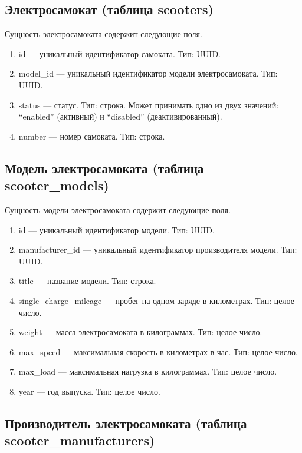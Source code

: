 \subsection{Электросамокат (таблица scooters)}

Сущность электросамоката содержит следующие поля.

\begin{enumerate}
	\item id --- уникальный идентификатор самоката. Тип: UUID.
	\item model\_id --- уникальный идентификатор модели электросамоката. Тип: UUID.
	\item status --- статус. Тип: строка. Может принимать одно из двух значений:
	      \enquote{enabled} (активный) и \enquote{disabled} (деактивированный).
	\item number --- номер самоката. Тип: строка.
\end{enumerate}

\subsection{Модель электросамоката (таблица scooter\_models)}

Сущность модели электросамоката содержит следующие поля.

\begin{enumerate}
	\item id --- уникальный идентификатор модели. Тип: UUID.
	\item manufacturer\_id --- уникальный идентификатор производителя модели. Тип: UUID.
	\item title --- название модели. Тип: строка.
	\item single\_charge\_mileage --- пробег на одном заряде в километрах. Тип: целое
	      число.
	\item weight --- масса электросамоката в килограммах. Тип: целое число.
	\item max\_speed --- максимальная скорость в километрах в час. Тип: целое число.
	\item max\_load --- максимальная нагрузка в килограммах. Тип: целое число.
	\item year --- год выпуска. Тип: целое число.
\end{enumerate}

\subsection{Производитель электросамоката (таблица scooter\_manufacturers)}


